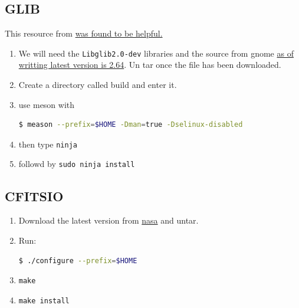 \documentclass{article}
\begin{document}
\subsection{GLIB}
   This resource from \href{http://www.linuxfromscratch.org/blfs/view/svn/general/glib2.html}{was found to be helpful.}
\begin{enumerate}
    \item We will need the \texttt{Libglib2.0-dev} libraries and the source from gnome \href{http://ftp.gnome.org/pub/gnome/sources/glib/2.64/glib-2.64.3.tar.xz}{as of writting latest version is 2.64}. Un tar once the file has been downloaded.  
    \item Create a directory called build and enter it.
    \item use meson with \begin{lstlisting}[language=bash]
    $ meason --prefix=$HOME -Dman=true -Dselinux-disabled
    \end{lstlisting}
    \item then type \texttt{ninja}
    \item followd by \texttt{sudo ninja install}
\end{enumerate}
         
\subsection{CFITSIO}
\begin{enumerate}
    \item Download the latest version from \href{http://heasarc.gsfc.nasa.gov/FTP/software/fitsio/c/cfitsio-3.48.tar.gz}{nasa} and untar.
    \item Run: \begin{lstlisting}[language=bash]
    $ ./configure --prefix=$HOME 
    \end{lstlisting}
    \item \texttt{make}
    \item \texttt{make install}
\end{enumerate}
\end{document}
